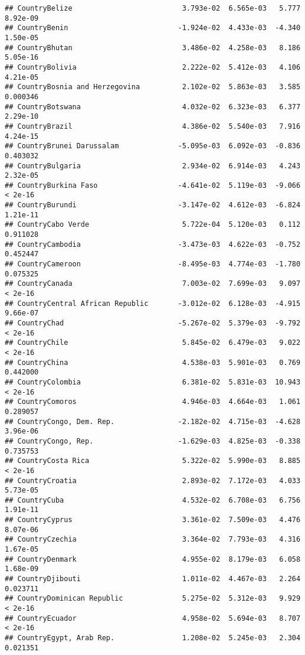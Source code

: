 \documentclass[
]{article}
\begin{document}
\begin{verbatim}
## CountryBelize                          3.793e-02  6.565e-03   5.777 8.92e-09
## CountryBenin                          -1.924e-02  4.433e-03  -4.340 1.50e-05
## CountryBhutan                          3.486e-02  4.258e-03   8.186 5.05e-16
## CountryBolivia                         2.222e-02  5.412e-03   4.106 4.21e-05
## CountryBosnia and Herzegovina          2.102e-02  5.863e-03   3.585 0.000346
## CountryBotswana                        4.032e-02  6.323e-03   6.377 2.29e-10
## CountryBrazil                          4.386e-02  5.540e-03   7.916 4.24e-15
## CountryBrunei Darussalam              -5.095e-03  6.092e-03  -0.836 0.403032
## CountryBulgaria                        2.934e-02  6.914e-03   4.243 2.32e-05
## CountryBurkina Faso                   -4.641e-02  5.119e-03  -9.066  < 2e-16
## CountryBurundi                        -3.147e-02  4.612e-03  -6.824 1.21e-11
## CountryCabo Verde                      5.722e-04  5.120e-03   0.112 0.911028
## CountryCambodia                       -3.473e-03  4.622e-03  -0.752 0.452447
## CountryCameroon                       -8.495e-03  4.774e-03  -1.780 0.075325
## CountryCanada                          7.003e-02  7.699e-03   9.097  < 2e-16
## CountryCentral African Republic       -3.012e-02  6.128e-03  -4.915 9.66e-07
## CountryChad                           -5.267e-02  5.379e-03  -9.792  < 2e-16
## CountryChile                           5.845e-02  6.479e-03   9.022  < 2e-16
## CountryChina                           4.538e-03  5.901e-03   0.769 0.442000
## CountryColombia                        6.381e-02  5.831e-03  10.943  < 2e-16
## CountryComoros                         4.946e-03  4.664e-03   1.061 0.289057
## CountryCongo, Dem. Rep.               -2.182e-02  4.715e-03  -4.628 3.96e-06
## CountryCongo, Rep.                    -1.629e-03  4.825e-03  -0.338 0.735753
## CountryCosta Rica                      5.322e-02  5.990e-03   8.885  < 2e-16
## CountryCroatia                         2.893e-02  7.172e-03   4.033 5.73e-05
## CountryCuba                            4.532e-02  6.708e-03   6.756 1.91e-11
## CountryCyprus                          3.361e-02  7.509e-03   4.476 8.07e-06
## CountryCzechia                         3.364e-02  7.793e-03   4.316 1.67e-05
## CountryDenmark                         4.955e-02  8.179e-03   6.058 1.68e-09
## CountryDjibouti                        1.011e-02  4.467e-03   2.264 0.023711
## CountryDominican Republic              5.275e-02  5.312e-03   9.929  < 2e-16
## CountryEcuador                         4.958e-02  5.694e-03   8.707  < 2e-16
## CountryEgypt, Arab Rep.                1.208e-02  5.245e-03   2.304 0.021351

\end{verbatim}
\end{document}
